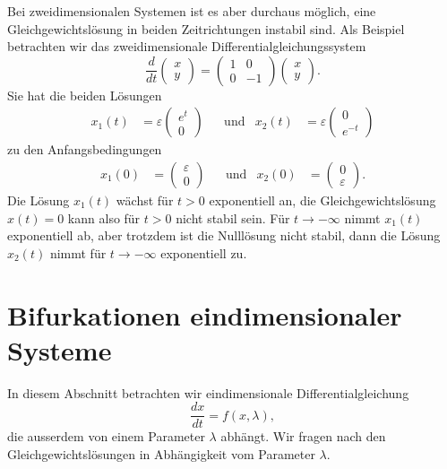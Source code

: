 Bei zweidimensionalen Systemen ist es aber durchaus möglich, eine
Gleichgewichtslösung in beiden Zeitrichtungen instabil sind.
Als Beispiel betrachten wir das zweidimensionale Differentialgleichungssystem
\begin{equation}
\frac{d}{dt}
\begin{pmatrix}x\\y\end{pmatrix}
=
\begin{pmatrix}1&0\\0&-1\end{pmatrix}
\begin{pmatrix}x\\y\end{pmatrix}.
\end{equation}
Sie hat die beiden Lösungen
\begin{align*}
x_1(t)&=
\varepsilon \begin{pmatrix}e^t\\0\end{pmatrix}
&&\text{und}&
x_2(t)
&=
\varepsilon \begin{pmatrix}0\\e^{-t}\end{pmatrix}
\end{align*}
zu den Anfangsbedingungen
\begin{align*}
x_1(0)&=\begin{pmatrix}\varepsilon\\0\end{pmatrix}
&&\text{und}&
x_2(0)&=\begin{pmatrix}0\\\varepsilon\end{pmatrix}.
\end{align*}
Die Lösung $x_1(t)$ wächst für $t>0$ exponentiell an, die Gleichgewichtslösung
$x(t)=0$ kann also für $t>0$ nicht stabil sein.
Für $t\to-\infty$ nimmt $x_1(t)$ exponentiell ab, aber trotzdem ist
die Nulllösung nicht stabil, dann die Lösung $x_2(t)$ nimmt für 
$t\to-\infty$ exponentiell zu.

\section{Bifurkationen eindimensionaler Systeme
\label{section:bifurkation-eindim}}
In diesem Abschnitt betrachten wir eindimensionale Differentialgleichung
\begin{equation}
\frac{dx}{dt} = f(x,\lambda),
\end{equation}
die ausserdem von einem Parameter $\lambda$ abhängt.
Wir fragen nach den Gleichgewichtslösungen in Abhängigkeit vom
Parameter $\lambda$.

